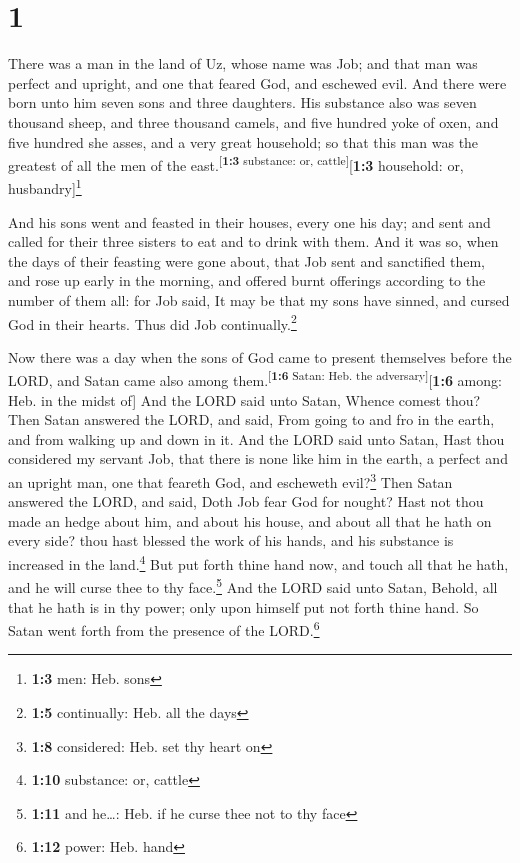 \hypertarget{section}{%
\section{1}\label{section}}

 There was a man in the land of Uz, whose name was Job;
and that man was perfect and upright, and one that feared God, and
eschewed evil.  And there were born unto him seven sons
and three daughters.  His substance also was seven
thousand sheep, and three thousand camels, and five hundred yoke of
oxen, and five hundred she asses, and a very great household; so that
this man was the greatest of all the men of the
east.\textsuperscript{{[}\textbf{1:3} substance: or,
cattle{]}}{[}\textbf{1:3} household: or, husbandry{]}\footnote{\textbf{1:3}
  men: Heb. sons}

 And his sons went and feasted in their houses, every one
his day; and sent and called for their three sisters to eat and to drink
with them.  And it was so, when the days of their feasting
were gone about, that Job sent and sanctified them, and rose up early in
the morning, and offered burnt offerings according to the number of them
all: for Job said, It may be that my sons have sinned, and cursed God in
their hearts. Thus did Job continually.\footnote{\textbf{1:5}
  continually: Heb. all the days}

 Now there was a day when the sons of God came to present
themselves before the LORD, and Satan came also among
them.\textsuperscript{{[}\textbf{1:6} Satan: Heb. the
adversary{]}}{[}\textbf{1:6} among: Heb. in the midst of{]}
 And the LORD said unto Satan, Whence comest thou? Then
Satan answered the LORD, and said, From going to and fro in the earth,
and from walking up and down in it.  And the LORD said
unto Satan, Hast thou considered my servant Job, that there is none like
him in the earth, a perfect and an upright man, one that feareth God,
and escheweth evil?\footnote{\textbf{1:8} considered: Heb. set thy heart
  on}  Then Satan answered the LORD, and said, Doth Job
fear God for nought?  Hast not thou made an hedge about
him, and about his house, and about all that he hath on every side? thou
hast blessed the work of his hands, and his substance is increased in
the land.\footnote{\textbf{1:10} substance: or, cattle} 
But put forth thine hand now, and touch all that he hath, and he will
curse thee to thy face.\footnote{\textbf{1:11} and he\ldots: Heb. if he
  curse thee not to thy face}  And the LORD said unto
Satan, Behold, all that he hath is in thy power; only upon himself put
not forth thine hand. So Satan went forth from the presence of the
LORD.\footnote{\textbf{1:12} power: Heb. hand}

